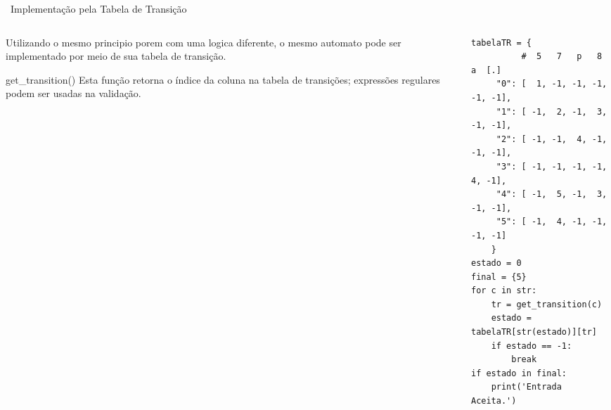 \documentclass{beamer}
\begin{document}
\begin{frame}[fragile]{\raisebox{-0.2\height}{}~Implementação pela Tabela de Transição}

\begin{columns}
\begin{column}{0.45\textwidth}
    \small \justifying Utilizando o mesmo principio porem com uma logica diferente, o mesmo automato pode ser implementado por meio de sua tabela de transição.
    
    \begin{block}{get\_transition()}
    \small Esta função retorna o índice da coluna na tabela de transições; expressões regulares podem ser usadas na validação.
    \end{block}
    
\end{column}
\begin{column}{0.45\textwidth}
\begin{verbatim}
tabelaTR = {
          #  5   7   p   8   a  [.]
     "0": [  1, -1, -1, -1, -1, -1],
     "1": [ -1,  2, -1,  3, -1, -1],
     "2": [ -1, -1,  4, -1, -1, -1],
     "3": [ -1, -1, -1, -1,  4, -1],
     "4": [ -1,  5, -1,  3, -1, -1],
     "5": [ -1,  4, -1, -1, -1, -1]
    }
estado = 0
final = {5}
for c in str:
    tr = get_transition(c)
    estado = tabelaTR[str(estado)][tr]
    if estado == -1:
        break
if estado in final:
    print('Entrada Aceita.')
\end{verbatim}
\end{column}
\end{columns}
\end{frame}

\end{document}
